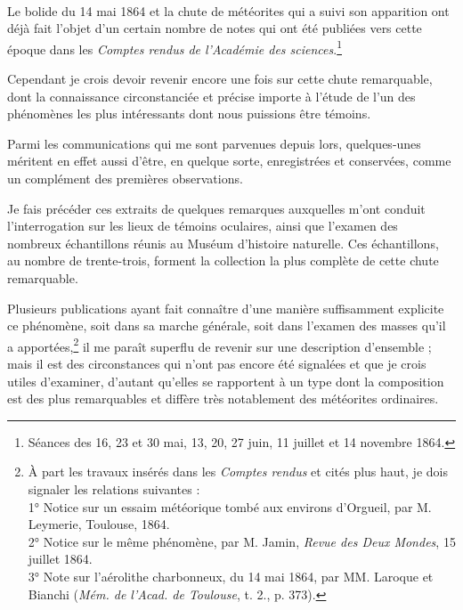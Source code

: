 \documentclass[a4paper, 11pt, oneside, polutonikogreek, french]{article}
\begin{document}
\paragraph{}
Le bolide du 14 mai 1864 et la chute de météorites qui a suivi son apparition ont déjà fait l'objet d'un certain nombre de notes qui ont été publiées vers cette époque dans les \emph{Comptes rendus de l'Académie des sciences}.\footnote{Séances des 16, 23 et 30 mai, 13, 20, 27 juin, 11 juillet et 14 novembre 1864.}

Cependant je crois devoir revenir encore une fois sur cette chute remarquable, dont la connaissance circonstanciée et précise importe à l'étude de l'un des phénomènes les plus intéressants dont nous puissions être témoins.

Parmi les communications qui me sont parvenues depuis lors, quelques-unes méritent en effet aussi d'être, en quelque sorte, enregistrées et conservées, comme un complément des premières observations.

Je fais précéder ces extraits de quelques remarques auxquelles m'ont conduit l'interrogation sur les lieux de témoins oculaires, ainsi que l'examen des nombreux échantillons réunis au Muséum d'histoire naturelle. Ces échantillons, au nombre de trente-trois, forment la collection la plus complète de cette chute remarquable.

Plusieurs publications ayant fait connaître d'une manière suffisamment explicite ce phénomène, soit dans sa marche générale, soit dans l'examen des masses qu'il a apportées,\footnote{À part les travaux insérés dans les \emph{Comptes rendus} et cités plus haut, je dois signaler les relations suivantes :\\\hspace*{10mm}1° Notice sur un essaim météorique tombé aux environs d'Orgueil, par M. Leymerie, Toulouse, 1864.\\\hspace*{10mm}2° Notice sur le même phénomène, par M. Jamin, \emph{Revue des Deux Mondes}, 15 juillet 1864.\\\hspace*{10mm}3° Note sur l'aérolithe charbonneux, du 14 mai 1864, par MM. Laroque et Bianchi (\emph{Mém. de l'Acad. de Toulouse}, t. 2., p. 373).} il me paraît superflu de revenir sur une description d'ensemble ; mais il est des circonstances qui n'ont pas encore été signalées et que je crois utiles d'examiner, d'autant qu'elles se rapportent à un type dont la composition est des plus remarquables et diffère très notablement des météorites ordinaires.
\end{document}
